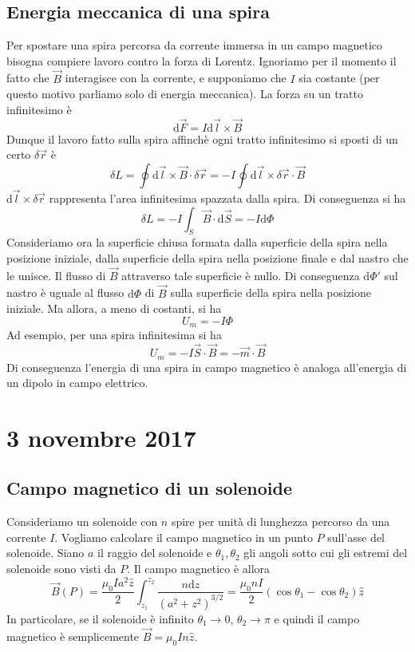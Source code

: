 \documentclass[a4paper,11pt]{book}
\newcommand{\dif}{\mathrm{d}}
\theoremstyle{definition}
\theoremstyle{theorem}
\begin{document}
\subsection{Energia meccanica di una spira}
Per spostare una spira percorsa da corrente immersa in un campo magnetico bisogna compiere lavoro contro la forza di Lorentz. Ignoriamo per il momento il fatto che $\vec{B}$ interagisce con la corrente, e supponiamo che $I$ sia costante (per questo motivo parliamo solo di energia meccanica). La forza su un tratto infinitesimo è
\[\dif\vec{F}=I\dif\vec{l}\times\vec{B}\]
Dunque il lavoro fatto sulla spira affinchè ogni tratto infinitesimo si sposti di un certo $\delta\vec{r}$ è
\[\delta L=\oint\dif\vec{l}\times\vec{B}\cdot\delta\vec{r}=-I\oint\dif\vec{l}\times\delta\vec{r}\cdot\vec{B}\]
$\dif\vec{l}\times\delta\vec{r}$ rappresenta l'area infinitesima spazzata dalla spira. Di conseguenza si ha
\[\delta L=-I\int_S\vec{B}\cdot\dif\vec{S}=-I\dif\Phi\]
Consideriamo ora la superficie chiusa formata dalla superficie della spira nella posizione iniziale, dalla superficie della spira nella posizione finale e dal nastro che le unisce. Il flusso di $\vec{B}$ attraverso tale superficie è nullo. Di conseguenza $\dif\Phi'$ sul nastro è uguale al flusso $\dif\Phi$ di $\vec{B}$ sulla superficie della spira nella posizione iniziale. Ma allora, a meno di costanti, si ha
\[U_m=-I\Phi\]
Ad esempio, per una spira infinitesima si ha
\[U_m=-I\vec{S}\cdot\vec{B}=-\vec{m}\cdot\vec{B}\]
Di conseguenza l'energia di una spira in campo magnetico è analoga all'energia di un dipolo in campo elettrico.
\section{3 novembre 2017}
\subsection{Campo magnetico di un solenoide}
Consideriamo un solenoide con $n$ spire per unità di lunghezza percorso da una corrente $I$. Vogliamo calcolare il campo magnetico in un punto $P$ sull'asse del solenoide. Siano $a$ il raggio del solenoide e $\theta_1,\theta_2$ gli angoli sotto cui gli estremi del solenoide sono visti da $P$. Il campo magnetico è allora
\[\vec{B}(P)=\frac{\mu_0Ia^2\hat{z}}{2}\int_{z_1}^{z_2}\frac{n\dif z}{(a^2+z^2)^{3/2}}=\frac{\mu_0nI}{2}\left(\cos\theta_1-\cos\theta_2\right)\hat{z}\]
In particolare, se il solenoide è infinito $\theta_1\to0$, $\theta_2\to\pi$ e quindi il campo magnetico è semplicemente $\vec B=\mu_0In\hat{z}$.
\end{document}
